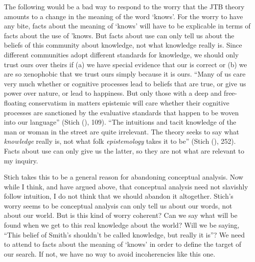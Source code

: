 \documentclass[
  11pt,
  letterpaper,
  DIV=11,
  numbers=noendperiod,
  oneside]{scrartcl}
\begin{document}
The following would be a bad way to respond to the worry that the JTB
theory amounts to a change in the meaning of the word `knows'. For the
worry to have any bite, facts about the meaning of `knows' will have to
be explicable in terms of facts about the use of 'knows. But facts about
use can only tell us about the beliefs of this community about
knowledge, not what knowledge really is. Since different communities
adopt different standards for knowledge, we should only trust ours over
theirs if (a) we have special evidence that our is correct or (b) we are
so xenophobic that we trust ours simply because it is ours. ``Many of us
care very much whether or cognitive processes lead to beliefs that are
true, or give us power over nature, or lead to happiness. But only those
with a deep and free-floating conservatism in matters epistemic will
care whether their cognitive processes are sanctioned by the evaluative
standards that happen to be woven into our language'' (Stich
(), 109). ``The intuitions and tacit
knowledge of the man or woman in the street are quite irrelevant. The
theory seeks to say what \emph{knowledge} really is, not what folk
\emph{epistemology} takes it to be'' (Stich
(), 252). Facts about use can only give us the latter, so they are not
what are relevant to my inquiry.

Stich takes this to be a general reason for abandoning conceptual
analysis. Now while I think, and have argued above, that conceptual
analysis need not slavishly follow intuition, I do not think that we
should abandon it altogether. Stich's worry seems to be conceptual
analysis can only tell us about our words, not about our world. But is
this kind of worry coherent? Can we say what will be found when we get
to this real knowledge about the world? Will we be saying, ``This belief
of Smith's shouldn't be called knowledge, but really it is''? We need to
attend to facts about the meaning of `knows' in order to define the
target of our search. If not, we have no way to avoid incoherencies like
this one.
\end{document}
